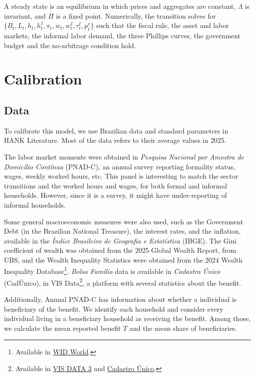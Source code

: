 \documentclass[12pt]{article}
\begin{document}
A steady state is an equilibrium in which prices and aggregates are constant, $\Lambda$
is invariant, and $\Pi$ is a fixed point. Numerically, the transition solves for
$\{B_t, L_t, h_t, h_t^I, \pi_t, w_t, w_t^I, \tau_t^\ell, p^e_t\}$ such that the fiscal
rule, the asset and labor markets, the informal labor demand, the three Phillips curves,
the government budget and the no-arbitrage condition hold.

\section{Calibration}
\subsection*{Data}

To calibrate this model, we use Brazilian data and standard parameters in HANK
Literature. Most of the data refers to their average values in 2025.

The labor market moments were obtained in \textit{Pesquisa Nacional por Amostra de
Domicílio Contínua} (PNAD-C), an annual survey reporting formality status, wages, weekly
worked hours, etc. This panel is interesting to match the sector transitions and the
worked hours and wages, for both formal and informal households. However, since it is a
survey, it might have under-reporting of informal households.

Some general macroeconomic measures were also used, such as the Government Debt (in the
Brazilian National Treasure), the interest rates, and the inflation, available in the
\textit{Índice Brasileiro de Geografia e Estatística} (IBGE). The Gini coefficient of
wealth was obtained from the 2025 Global Wealth Report, from UBS, and the Wealth
Inequality Statistics were obtained from the 2024 Wealth Inequality Database\footnote{
Available in \href{https://wid.world/world/}{WID World}.}. \textit{Bolsa Família} data
is available in \textit{Cadastro Único} (CadÚnico), in VIS Data\footnote{ Available in
\href{https://aplicacoes.cidadania.gov.br/vis/data3/data-explorer.php}{VIS DATA 3} and
\href{https://paineis.mds.gov.br/public/extensions/observatorio-do-cadastro-unico/index.html}{Cadastro
Único}.}, a platform with several statistics about the benefit.

Additionally, Annual PNAD-C has information about whether a individual is beneficiary of
the benefit. We identify each household and consider every individual living in a
beneficiary household as receiving the benefit. Among those, we calculate the mean
reported benefit $T$ and the mean share of beneficiaries.
\end{document}
